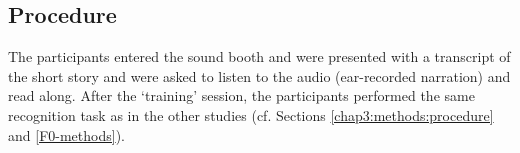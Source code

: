 \subsection{Procedure}

The participants entered the sound booth and were presented with a transcript of the short story and were asked to listen to the audio (ear-recorded narration) and read along.  After the `training' session, the participants performed the same recognition task as in the other studies (cf. Sections \ref{chap3:methods:procedure} and \ref{F0-methods}).







